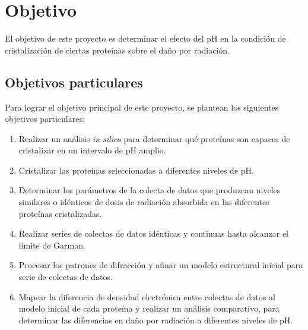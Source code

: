 \chapter{Objetivo}

El objetivo de este proyecto es determinar el efecto del pH en la condición de cristalización de ciertas proteínas sobre el daño por radiación. 
\section{Objetivos particulares}
Para lograr el objetivo principal de este proyecto, se plantean los siguientes objetivos particulares:


\begin{enumerate}
	\item Realizar un análisis \emph{in silico} para determinar qué proteínas son capaces de cristalizar en un intervalo de pH amplio.
	\item Cristalizar las proteínas seleccionadas a diferentes niveles de pH. 
	\item Determinar los parámetros de la colecta de datos que produzcan niveles similares o idénticos de dosis de radiación absorbida en las diferentes proteínas cristalizadas.
	\item Realizar series de colectas de datos idénticas y continuas hasta alcanzar el límite de Garman.
	\item Procesar los patrones de difracción y afinar un modelo estructural inicial para serie de colectas de datos.
	\item Mapear la diferencia de densidad electrónica entre colectas de datos al modelo inicial de cada proteína y realizar un análisis comparativo, para determinar las diferencias en daño por radiación a diferentes niveles de pH.
\end{enumerate}	